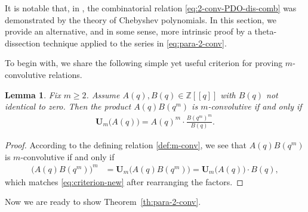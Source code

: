 \documentclass[12pt,reqno]{amsart}
\numberwithin{equation}{section}
\theoremstyle{plain}
\newtheorem{lemma}[theorem]{Lemma}
\theoremstyle{definition}
\theoremstyle{named}
\newcommand{\UU}{\mathbf{U}}
\begin{document}
It is notable that, in \cite{FuSel}, the combinatorial relation \eqref{eq:2-conv-PDO-dis-comb} was demonstrated by the theory of Chebyshev polynomials. In this section, we provide an alternative, and in some sense, more intrinsic proof by a theta-dissection technique applied to the series in \eqref{eq:para-2-conv}.

To begin with, we share the following simple yet useful criterion for proving $m$-convolutive relations.

\begin{lemma}\label{criterion-new}
	Fix $m\geq 2$. Assume $A(q),B(q)\in \mathbb{Z}[[q]]$ with $B(q)$ not identical to zero. Then the product $A(q)B(q^m)$ is $m$-convolutive if and only if 
	\begin{align}\label{eq:criterion-new}
		\UU_m\big(A(q)\big) = A(q)^m\cdot \frac{B(q^m)^m}{B(q)}.    
	\end{align}
\end{lemma}

\begin{proof}
	According to the defining relation \eqref{def:m-conv}, we see that $A(q)B(q^m)$ is $m$-convolutive if and only if 
	\begin{align*}
		\big(A(q)B(q^m)\big)^m &= \UU_m\big(A(q)B(q^m)\big) = \UU_m\big(A(q)\big)\cdot B(q),
	\end{align*}
	which matches \eqref{eq:criterion-new} after rearranging the factors.
\end{proof}

Now we are ready to show Theorem~\ref{th:para-2-conv}.
\end{document}
